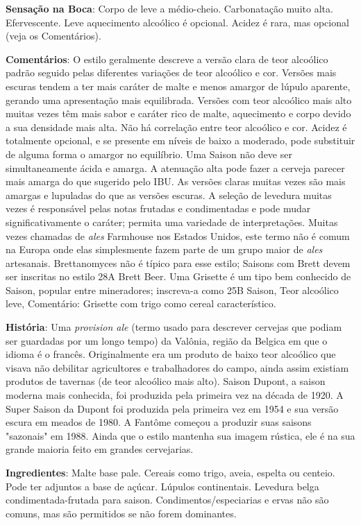 \textbf{Sensação na Boca}: Corpo de leve a médio-cheio. Carbonatação muito alta. Efervescente. Leve aquecimento alcoólico é opcional. Acidez é rara, mas opcional (veja os Comentários).

\textbf{Comentários}: O estilo geralmente descreve a versão clara de teor alcoólico padrão seguido pelas diferentes variações de teor alcoólico e cor. Versões mais escuras tendem a ter mais caráter de malte e menos amargor de lúpulo aparente, gerando uma apresentação mais equilibrada. Versões com teor alcoólico mais alto muitas vezes têm mais sabor e caráter rico de malte, aquecimento e corpo devido a sua densidade mais alta. Não há correlação entre teor alcoólico e cor.
Acidez é totalmente opcional, e se presente em níveis de baixo a moderado, pode substituir de alguma forma o amargor no equilíbrio. Uma Saison não deve ser simultaneamente ácida e amarga. A atenuação alta pode fazer a cerveja parecer mais amarga do que sugerido pelo IBU. As versões claras muitas vezes são mais amargas e lupuladas do que as versões escuras. A seleção de levedura muitas vezes é responsável pelas notas frutadas e condimentadas e pode mudar significativamente o caráter; permita uma variedade de interpretações.
Muitas vezes chamadas de \textit{ales} Farmhouse nos Estados Unidos, este termo não é comum na Europa onde elas simplesmente fazem parte de um grupo maior de \textit{ales} artesanais. Brettanomyces não é típico para esse estilo; Saisons com Brett devem ser inscritas no estilo 28A Brett Beer. Uma Grisette é um tipo bem conhecido de Saison, popular entre mineradores; inscreva-a como 25B Saison, Teor alcoólico leve, Comentário: Grisette com trigo como cereal característico.

\textbf{História}: Uma \textit{provision ale} (termo usado para descrever cervejas que podiam ser guardadas por um longo tempo) da Valônia, região da Belgica em que o idioma é o francês. Originalmente era um produto de baixo teor alcoólico que visava não debilitar agricultores e trabalhadores do campo, ainda assim existiam produtos de tavernas (de teor alcoólico mais alto). Saison Dupont, a saison moderna mais conhecida, foi produzida pela primeira vez na década de 1920. A Super Saison da Dupont foi produzida pela primeira vez em 1954 e sua versão escura em meados de 1980. A Fantôme começou a produzir suas saisons "sazonais" em 1988. Ainda que o estilo mantenha sua imagem rústica, ele é na sua grande maioria feito em grandes cervejarias.

\textbf{Ingredientes}: Malte base pale. Cereais como trigo, aveia, espelta ou centeio. Pode ter adjuntos a base de açúcar. Lúpulos continentais. Levedura belga condimentada-frutada para saison. Condimentos/especiarias e ervas não são comuns, mas são permitidos se não forem dominantes.

